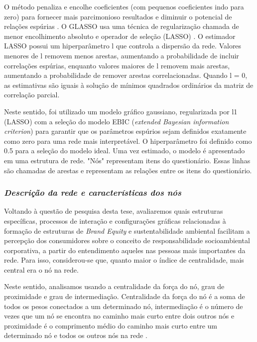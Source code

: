 O método penaliza e encolhe coeficientes (com pequenos coeficientes indo para zero) para fornecer mais parcimonioso resultados e diminuir o potencial de relações espúrias \cite{Christensen2021EstimatingTutorial}. O GLASSO usa uma técnica de regularização chamada de menor encolhimento absoluto e operador de seleção (LASSO) \cite{Tibshirani1996RegressionLasso}. O estimador LASSO possui um hiperparâmetro l que controla a dispersão da rede. Valores menores de l removem menos arestas, aumentando a probabilidade de incluir correlações espúrias, enquanto valores maiores de l removem mais arestas, aumentando a probabilidade de remover arestas correlacionadas. Quando l = 0, as estimativas são iguais à solução de mínimos quadrados ordinários da matriz de correlação parcial.

Neste sentido, foi utilizado um modelo gráfico gaussiano, regularizada por l1 (LASSO) com a seleção do modelo EBIC (\textit{extended Bayesian information criterion}) \cite{Foygel2010ExtendedModels} para garantir que os parâmetros espúrios sejam definidos exatamente como zero para uma rede mais interpretável. O hiperparâmetro foi definido como 0.5 para a seleção do modelo ideal. Uma vez estimado, o modelo é apresentado em uma estrutura de rede. "Nós" representam itens do questionário. Essas linhas são chamadas de arestas e representam as relações entre os itens do questionário.

\subsubsection*{\textit{Descrição da rede e características dos nós}} 

Voltando à questão de pesquisa desta tese, avaliaremos quais estruturas específicas, processos de interação e configurações gráficas relacionadas à formação de estruturas de \textit{Brand Equity} e sustentabilidade ambiental facilitam a percepção dos consumidores sobre o conceito de responsabilidade socioambiental corporativa, a partir do entendimento aqueles nas pessoas mais importantes da rede. Para isso, considerou-se que, quanto maior o índice de centralidade, mais central era o nó na rede.

Neste sentido, analisamos usando a centralidade da força do nó, grau de proximidade e grau de intermediação. Centralidade da força do nó é a soma de todos os pesos conectados a um determinado nó, intermediação é o número de vezes que um nó se encontra no caminho mais curto entre dois outros nós e proximidade é o comprimento médio do caminho mais curto entre um determinado nó e todos os outros nós na rede \cite{Opsahl2010NodePaths}. 

